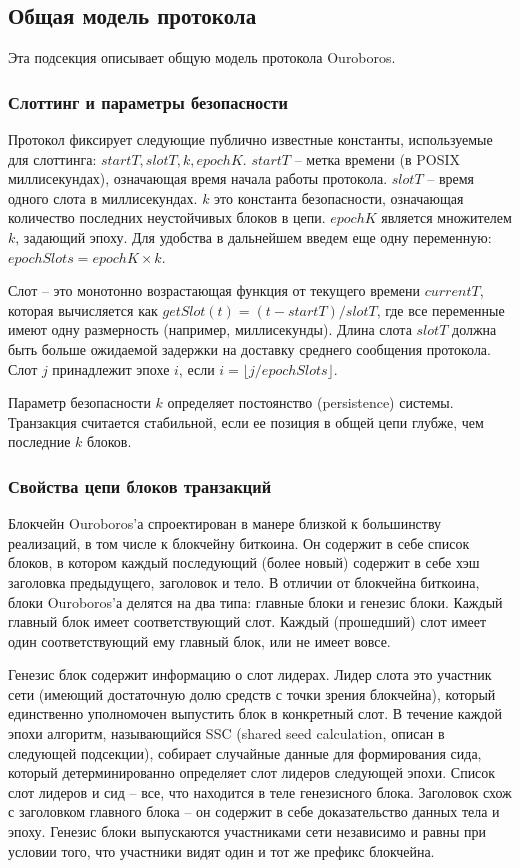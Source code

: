 \documentclass[specification,annotation]{itmo-student-thesis}
\begin{document}
\subsection{Общая модель протокола}

Эта подсекция описывает общую модель протокола Ouroboros.

\subsubsection{Слоттинг и параметры безопасности}

Протокол фиксирует следующие публично известные константы,
используемые для слоттинга: $startT, slotT, k, epochK$. $startT$ --
метка времени (в POSIX миллисекундах), означающая время начала работы
протокола. $slotT$ -- время одного слота в миллисекундах. $k$ это
константа безопасности, означающая количество последних неустойчивых
блоков в цепи. $epochK$ является множителем $k$, задающий эпоху. Для
удобства в дальнейшем введем еще одну переменную: $epochSlots = epochK
\times k$.

Слот -- это монотонно возрастающая функция от текущего времени
$currentT$, которая вычисляется как $getSlot(t) = (t - startT) /
slotT$, где все переменные имеют одну размерность (например,
миллисекунды). Длина слота $slotT$ должна быть больше ожидаемой
задержки на доставку среднего сообщения протокола.  Слот $j$
принадлежит эпохе $i$, если $i = \lfloor j / epochSlots \rfloor$.

Параметр безопасности $k$ определяет постоянство (persistence)
системы. Транзакция считается стабильной, если ее позиция в общей цепи
глубже, чем последние $k$ блоков.

\subsubsection{Свойства цепи блоков транзакций}

Блокчейн Ouroboros'а спроектирован в манере близкой к большинству
реализаций, в том числе к блокчейну биткоина. Он содержит в себе
список блоков, в котором каждый последующий (более новый) содержит в
себе хэш заголовка предыдущего, заголовок и тело. В отличии от
блокчейна биткоина, блоки Ouroboros'а делятся на два типа: главные
блоки и генезис блоки. Каждый главный блок имеет соответствующий
слот. Каждый (прошедший) слот имеет один соответствующий ему главный
блок, или не имеет вовсе.

Генезис блок содержит информацию о слот лидерах. Лидер слота это
участник сети (имеющий достаточную долю средств с точки зрения
блокчейна), который единственно уполномочен выпустить блок в
конкретный слот. В течение каждой эпохи алгоритм, называющийся SSC
(shared seed calculation, описан в следующей подсекции), собирает
случайные данные для формирования сида, который детерминированно
определяет слот лидеров следующей эпохи. Список слот лидеров и сид --
все, что находится в теле генезисного блока. Заголовок схож с
заголовком главного блока -- он содержит в себе доказательство данных
тела и эпоху. Генезис блоки выпускаются участниками сети независимо и
равны при условии того, что участники видят один и тот же префикс
блокчейна.
\end{document}
